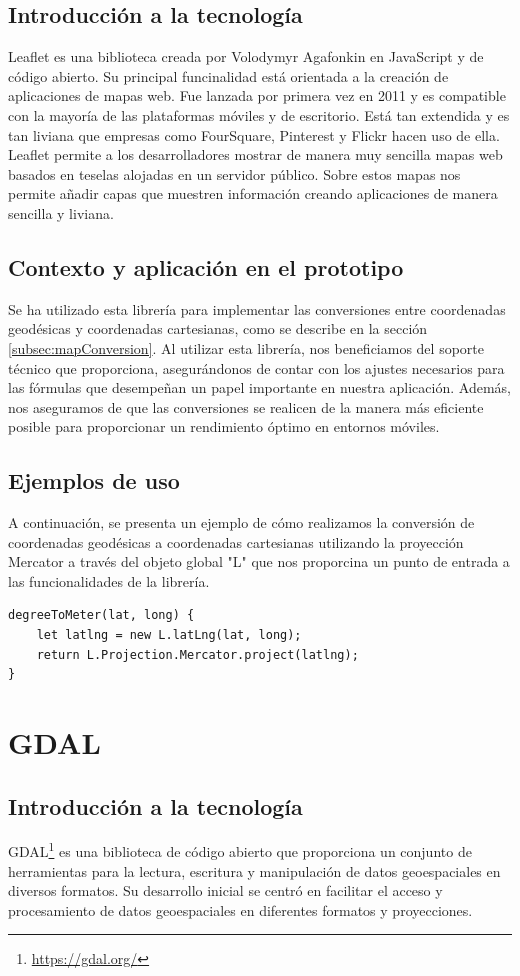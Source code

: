 \documentclass[a4paper, 11pt]{book}
\begin{document}
\subsection{Introducción a la tecnología}
Leaflet es una biblioteca creada por Volodymyr Agafonkin en JavaScript y de código abierto.
Su principal funcinalidad está orientada a la creación de aplicaciones de mapas web. Fue lanzada por primera vez en 2011 y es compatible con la mayoría de las plataformas móviles y de escritorio.
Está tan extendida y es tan liviana que empresas como FourSquare, Pinterest y Flickr hacen uso de ella.
Leaflet permite a los desarrolladores mostrar de manera muy sencilla mapas web basados en teselas alojadas en un servidor público. Sobre estos mapas nos permite añadir capas que muestren información creando aplicaciones de manera sencilla y liviana.
\subsection{Contexto y aplicación en el prototipo}
Se ha utilizado esta librería para implementar las conversiones entre coordenadas geodésicas y coordenadas cartesianas, como se describe en la sección \ref{subsec:mapConversion}. Al utilizar esta librería, nos beneficiamos del soporte técnico que proporciona, asegurándonos de contar con los ajustes necesarios para las fórmulas que desempeñan un papel importante en nuestra aplicación. Además, nos aseguramos de que las conversiones se realicen de la manera más eficiente posible para proporcionar un rendimiento óptimo en entornos móviles.
\subsection{Ejemplos de uso}
A continuación, se presenta un ejemplo de cómo realizamos la conversión de coordenadas geodésicas a coordenadas cartesianas utilizando la proyección Mercator a través del objeto global "L" que nos proporcina un punto de entrada a las funcionalidades de la librería.
\begin{verbatim}
degreeToMeter(lat, long) {
    let latlng = new L.latLng(lat, long);
    return L.Projection.Mercator.project(latlng);
}
\end{verbatim}
\section{GDAL}
\subsection{Introducción a la tecnología}
GDAL\footnote{\url{https://gdal.org/}} es una biblioteca de código abierto que proporciona un conjunto de herramientas para la lectura, escritura y manipulación de datos geoespaciales en diversos formatos. Su desarrollo inicial se centró en facilitar el acceso y procesamiento de datos geoespaciales en diferentes formatos y proyecciones.
\end{document}
